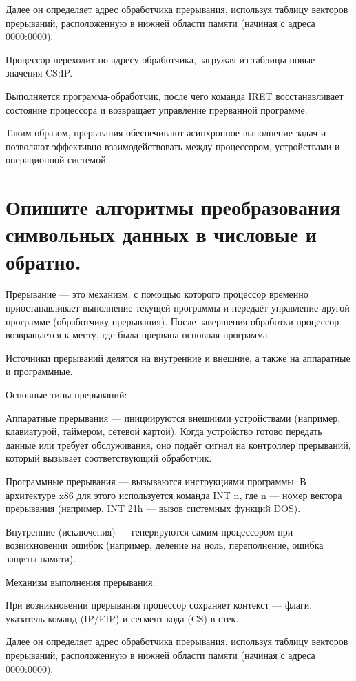 Далее он определяет адрес обработчика прерывания, используя таблицу векторов прерываний, расположенную в нижней области памяти (начиная с адреса 0000:0000).

Процессор переходит по адресу обработчика, загружая из таблицы новые значения CS:IP.

Выполняется программа-обработчик, после чего команда IRET восстанавливает состояние процессора и возвращает управление прерванной программе.

Таким образом, прерывания обеспечивают асинхронное выполнение задач и позволяют эффективно взаимодействовать между процессором, устройствами и операционной системой.

\section{Опишите алгоритмы преобразования символьных данных в числовые и обратно.}

Прерывание — это механизм, с помощью которого процессор временно приостанавливает выполнение текущей программы и передаёт управление другой программе (обработчику прерывания). После завершения обработки процессор возвращается к месту, где была прервана основная программа.

Источники прерываний делятся на внутренние и внешние, а также на аппаратные и программные.

Основные типы прерываний:

Аппаратные прерывания — инициируются внешними устройствами (например, клавиатурой, таймером, сетевой картой). Когда устройство готово передать данные или требует обслуживания, оно подаёт сигнал на контроллер прерываний, который вызывает соответствующий обработчик.

Программные прерывания — вызываются инструкциями программы. В архитектуре x86 для этого используется команда INT n, где n — номер вектора прерывания (например, INT 21h — вызов системных функций DOS).

Внутренние (исключения) — генерируются самим процессором при возникновении ошибок (например, деление на ноль, переполнение, ошибка защиты памяти).

Механизм выполнения прерывания:

При возникновении прерывания процессор сохраняет контекст — флаги, указатель команд (IP/EIP) и сегмент кода (CS) в стек.

Далее он определяет адрес обработчика прерывания, используя таблицу векторов прерываний, расположенную в нижней области памяти (начиная с адреса 0000:0000).

